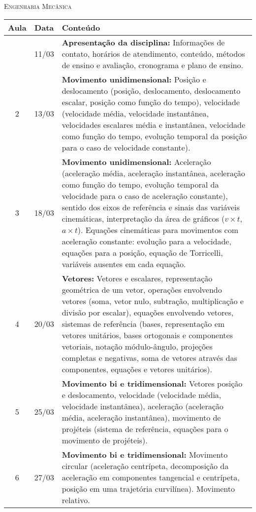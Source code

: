 \vspace{1cm}
\begin{center}
\Large\textsc{Engenharia Mecânica}
\end{center}
\begin{center}
\begin{longtable}{ccp{70mm}}
\toprule
Aula & Data & Conteúdo \\
\midrule
\endhead
\bottomrule
\endfoot
  1 & 11/03 & \textbf{Apresentação da disciplina:} Informações de contato, horários de atendimento, conteúdo, métodos de ensino e avaliação, cronograma e plano de ensino.\\
  2 & 13/03 & \textbf{Movimento unidimensional:} Posição e deslocamento (posição, deslocamento, deslocamento escalar, posição como função do tempo), velocidade (velocidade média, velocidade instantânea, velocidades escalares média e instantânea, velocidade como função do tempo, evolução temporal da posição para o caso de velocidade constante).\\
  3 & 18/03 & \textbf{Movimento unidimensional:} Aceleração (aceleração média, aceleração instantânea, aceleração como função do tempo, evolução temporal da velocidade para o caso de aceleração constante), sentido dos eixos de referência e sinais das variáveis cinemáticas, interpretação da área de gráficos ($v \times t$, $a \times  t$). Equações cinemáticas para movimentos com aceleração constante: evolução para a velocidade, equações para a posição, equação de Torricelli, variáveis ausentes em cada equação.\\
  4 & 20/03 & \textbf{Vetores:} Vetores e escalares, representação geométrica de um vetor, operações envolvendo vetores (soma, vetor nulo, subtração, multiplicação e divisão por escalar), equações envolvendo vetores, sistemas de referência (bases, representação em vetores unitários, bases ortogonais e componentes vetoriais, notação módulo-ângulo, projeções completas e negativas, soma de vetores através das componentes, equações e vetores unitários). \\
  5 & 25/03 & \textbf{Movimento bi e tridimensional:} Vetores posição e deslocamento, velocidade (velocidade média, velocidade instantânea), aceleração (aceleração média, aceleração instantânea), movimento de projéteis (sistema de referência, equações para o movimento de projéteis). \\
  6 & 27/03 & \textbf{Movimento bi e tridimensional:} Movimento circular (aceleração centrípeta, decomposição da aceleração em componentes tangencial e centrípeta, posição em uma trajetória curvilínea). Movimento relativo.\\

\end{longtable}
\end{center}
